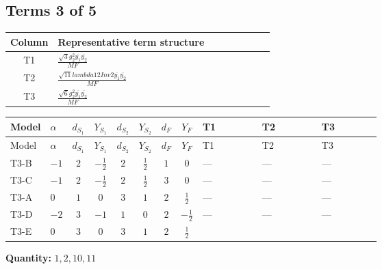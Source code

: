 \documentclass[8pt]{article}
\begin{document}
\begin{landscape}
\subsection*{Terms 3 of 5}
\begin{center}
\begin{tabular}{@{}c >{\raggedright\arraybackslash}p{0.82\linewidth}@{}}
\toprule
Column & Representative term structure \\
\midrule
T1 & \(\displaystyle \frac{\sqrt{3} g_{2}^{2} \overline{y_{1}} \overline{y_{2}}}{MF}\) \\
\midrule
T2 & \(\displaystyle \frac{\sqrt{11} lambda12Inv2 \overline{y_{1}} \overline{y_{2}}}{MF}\) \\
\midrule
T3 & \(\displaystyle \frac{\sqrt{6} g_{2}^{2} \overline{y_{1}} \overline{y_{2}}}{MF}\) \\
\midrule
\bottomrule
\end{tabular}
\end{center}
\smallskip
\tiny
\begin{longtable}{@{}llcccccc >{\raggedright\arraybackslash}p{0.21\linewidth} >{\raggedright\arraybackslash}p{0.21\linewidth} >{\raggedright\arraybackslash}p{0.21\linewidth}@{}}
\toprule
Model & $\alpha$ & $d_{S_1}$ & $Y_{S_1}$ & $d_{S_2}$ & $Y_{S_2}$ & $d_F$ & $Y_F$ & T1 & T2 & T3 \\
\midrule
\endfirsthead
\toprule
Model & $\alpha$ & $d_{S_1}$ & $Y_{S_1}$ & $d_{S_2}$ & $Y_{S_2}$ & $d_F$ & $Y_F$ & T1 & T2 & T3 \\
\midrule
\endhead
T3-B & $-1$ & $2$ & $-\frac{1}{2}$ & $2$ & $\frac{1}{2}$ & $1$ & $0$ & --- & --- & --- \\
\midrule
T3-C & $-1$ & $2$ & $-\frac{1}{2}$ & $2$ & $\frac{1}{2}$ & $3$ & $0$ & --- & --- & --- \\
\midrule
T3-A & $0$ & $1$ & $0$ & $3$ & $1$ & $2$ & $\frac{1}{2}$ & --- & --- & --- \\
\midrule
T3-D & $-2$ & $3$ & $-1$ & $1$ & $0$ & $2$ & $-\frac{1}{2}$ & --- & --- & --- \\
\midrule
T3-E & $0$ & $3$ & $0$ & $3$ & $1$ & $2$ & $\frac{1}{2}$ & \scriptsize\adjustbox{max width=\linewidth}{$\begin{gathered} - \frac{15 \sqrt{3} g_{2}^{2} \overline{y_{1}} \overline{y_{2}}}{8 MF}\end{gathered}$} & \scriptsize\adjustbox{max width=\linewidth}{$\begin{gathered} - \frac{3 \sqrt{11} lambda12Inv2 \overline{y_{1}} \overline{y_{2}}}{22 MF}\end{gathered}$} & \scriptsize\adjustbox{max width=\linewidth}{$\begin{gathered} - \frac{\sqrt{6} g_{2}^{2} \overline{y_{1}} \overline{y_{2}}}{6 MF}\end{gathered}$} \\
\midrule
\bottomrule
\end{longtable}
\clearpage
\noindent\textbf{Quantity: }$\mathrm{1,2,10,11}$\par\smallskip

\end{landscape}
\end{document}

